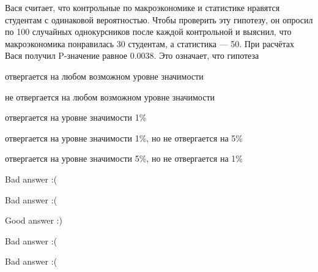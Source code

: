 
\begin{question}
Вася считает, что контрольные по макроэкономике и статистике нравятся
студентам с одинаковой вероятностью. Чтобы проверить эту гипотезу, он
опросил по 100 случайных однокурсников после каждой контрольной и
выяснил, что макроэкономика понравилась 30 студентам, а статистика ---
50. При расчётах Вася получил P-значение равное 0.0038. Это означает,
что гипотеза
\begin{answerlist}[2]
  \item отвергается на любом возможном уровне значимости
  \item не отвергается на любом возможном уровне значимости
  \item отвергается на уровне значимости 1\%
  \item отвергается на уровне значимости 1\%, но не отвергается на 5\%
  \item отвергается на уровне значимости 5\%, но не отвергается на 1\%
\end{answerlist}
\end{question}

\begin{solution}
\begin{answerlist}
  \item Bad answer :(
  \item Bad answer :(
  \item Good answer :)
  \item Bad answer :(
  \item Bad answer :(
\end{answerlist}
\end{solution}

